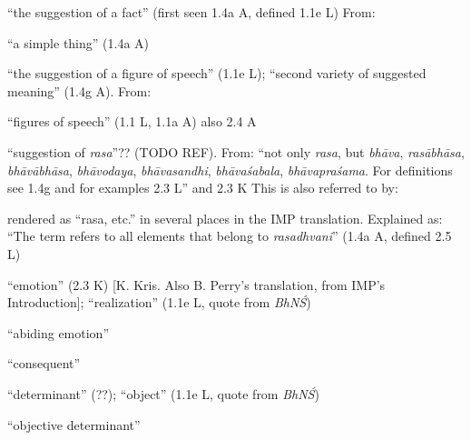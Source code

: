 \documentclass[10pt]{article}
\begin{document}
\begin{multicols}{2}
\begin{enumerate}
\begin{enumerate}
			 ``the suggestion of a fact'' (first seen 1.4a A, defined 1.1e L)
			From:
			\begin{itemize}
				 ``a simple thing'' (1.4a A)
			\end{itemize}

			 ``the suggestion of a figure of speech'' (1.1e L);
			``second variety of suggested meaning'' (1.4g A).
			From:
			\begin{itemize}
				 ``figures of speech'' (1.1 L, 1.1a A) also 2.4 A
			\end{itemize}

			 ``suggestion of \textit{rasa}''?? (TODO REF).
			From: ``not only \textit{rasa}, but \textit{bhāva}, \textit{rasā\-bhāsa}, \textit{bhāvābhāsa}, \textit{bhāvodaya}, \textit{bhāvasandhi}, \textit{bhāva\-śabala}, \textit{bhā\-vapraśama}.
			For definitions see 1.4g and for examples 2.3 L''
			and 2.3 K
			This is also referred to by:
			\begin{itemize}
				 rendered as ``rasa, etc.'' in several places in the IMP translation.
				Explained as: ``The term refers to all elements that belong to \textit{rasadhvani}'' (1.4a A, defined 2.5 L)
			\end{itemize}

		\end{enumerate}


		 ``emotion'' (2.3 K) [K. Kris. Also B. Perry's translation, from IMP's Introduction]; ``realization'' (1.1e L, quote from \textit{BhNŚ})

		 ``abiding emotion''

		 ``consequent''

		 ``determinant'' (??); ``object'' (1.1e L, quote from \textit{BhNŚ})
		\begin{enumerate}
			 ``objective determinant''


\end{enumerate}
\end{enumerate}
\end{multicols}
\end{document}
